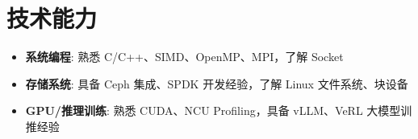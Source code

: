
\section{技术能力}
\begin{itemize}[parsep=0.2ex]
  \item \textbf{系统编程}: 熟悉 C/C++、SIMD、OpenMP、MPI，了解 Socket
  \item \textbf{存储系统}: 具备 Ceph 集成、SPDK 开发经验，了解 Linux 文件系统、块设备
  \item \textbf{GPU/推理训练}: 熟悉 CUDA、NCU Profiling，具备 vLLM、VeRL 大模型训推经验
\end{itemize}

